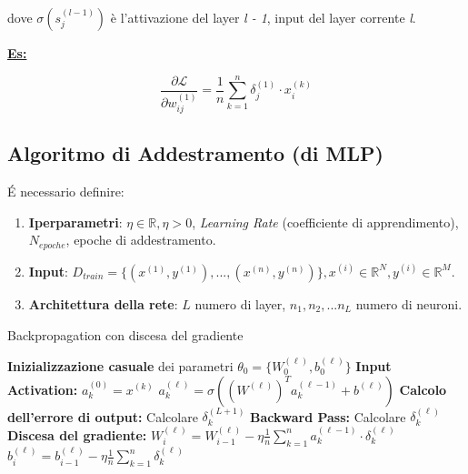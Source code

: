 \documentclass[a4paper,12pt]{article}
\newcommand{\esempio}{\noindent\textbf{\underline{Es:}} }
\begin{document}
	dove $\sigma ( s_j^{(l - 1)})$ è l'attivazione del layer \textit{l - 1}, input del layer corrente \textit{l}.

	\esempio

	\[
	\frac{\partial \mathcal{L}}{\partial w_{ij}^{(1)}} = \frac{1}{n} \sum_{k=1}^{n} \delta_j^{(1)} \cdot x_i^{(k)}
	\]

	\subsection{Algoritmo di Addestramento (di MLP)}

	\'E necessario definire:

	\begin{enumerate}
		\item \textbf{Iperparametri}: $ \eta \in \mathbb{R}, \eta > 0$, \textit{Learning Rate} (coefficiente di apprendimento), $N_{epoche}$, epoche di addestramento.
		\item \textbf{Input}: $D_{train} = \{ (x^{(1)}, y^{(1)}), ..., (x^{(n)}, y^{(n)}) \}, x^{(i)} \in \mathbb{R}^N, y^{(i)} \in \mathbb{R}^M$.
		\item \textbf{Architettura della rete}: $L$ numero di layer, $n_1, n_2, ... n_L$ numero di neuroni.
	\end{enumerate}

	\begin{algorithm}
		\caption{Backpropagation con discesa del gradiente}
		\begin{algorithmic}[1]
			\State \textbf{Inizializzazione casuale} dei parametri $\theta_0 = \{ W^{(\ell)}_0, b^{(\ell)}_0 \}$
			\State \textbf{Input Activation:}
			\State $a^{(0)}_k = x^{(k)}$
			\State $a^{(\ell)}_k = \sigma\left( (W^{(\ell)})^T a^{(\ell-1)}_k + b^{(\ell)} \right)$
			\EndFor
			\State \textbf{Calcolo dell'errore di output:}
			\State Calcolare $\delta^{(L+1)}_k$
			\State \textbf{Backward Pass:}
			\State Calcolare $\delta^{(\ell)}_k$
			\EndFor
			\EndFor
			\State \textbf{Discesa del gradiente:}
			\State $W^{(\ell)}_i = W^{(\ell)}_{i-1} - \eta \frac{1}{n} \sum_{k=1}^n a^{(\ell-1)}_k \cdot \delta^{(\ell)}_k$
			\State $b^{(\ell)}_i = b^{(\ell)}_{i-1} - \eta \frac{1}{n} \sum_{k=1}^n \delta^{(\ell)}_k$
			\EndFor
			\EndFor
		\end{algorithmic}
	\end{algorithm}
\end{document}
